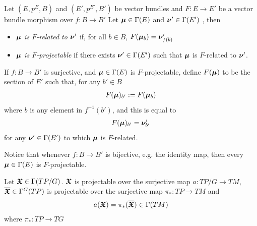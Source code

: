 \begin{definition}\label{defnRelatedProjectable}
Let $(E, p^E, B)$ and $(E', p^{E'}, B')$ be vector bundles and $F: E \to E'$ be a vector bundle morphism over $f: B \to B'$ Let $\bm{\mu} \in \Gamma(E)$ and $\bm{\nu}' \in \Gamma(E')$ , then
    \begin{itemize}
        
    \item \emph{$\bm{\mu}$ is $F$-related to $\bm{\nu}'$} if, for all $b \in B$, $F(\bm{\mu}_b) = \bm{\nu}'_{f(b)}$
    
    \item \emph{$\bm{\mu}$ is $F$-projectable} if there exists $\bm{\nu}' \in \Gamma(E')$ such that $\bm{\mu}$ is $F$-related to $\bm{\nu}'$.
    
    \end{itemize}
    
If $f:B \to B'$ is surjective, and $\bm{\mu} \in \Gamma(E)$ is $F$-projectable, define $F(\bm{\mu})$ to be the section of $E'$ such that, for any $b' \in B$
\begin{align} \label{funOfSection}
    F(\bm{\mu})_{b'} := F(\bm{\mu}_b)
\end{align} where $b$ is any element in $f^{-1}(b')$, and this is equal to \[F(\bm{\mu})_{b'} = \bm{\nu}'_{b'}\] for any $\bm{\nu}' \in \Gamma(E')$ to which $\bm{\mu}$ is $F$-related.

Notice that whenever $f: B \to B'$ is bijective, e.g. the identity map, then every $\bm{\mu} \in \Gamma(E)$ is $F$-projectable.

\end{definition}

\begin{theorem} \label{theoAnchorUpsect}
Let $\bm{\mathfrak{X}} \in \Gamma(TP/G)$. $\bm{\mathfrak{X}}$ is projectable over the surjective map $a: TP/G \to TM$, $\overline{\bm{\mathfrak{X}}} \in \Gamma^G(TP)$ is projectable over the surjective map $\pi_*: TP \to TM$ and
\begin{align} \label{theoAnchorUpsectEqn}
    a(\bm{\mathfrak{X}}) = \pi_*(\overline{\bm{\mathfrak{X}}}) \in \Gamma(TM)
\end{align} where $\pi_*: TP \to TG$
\end{theorem}

